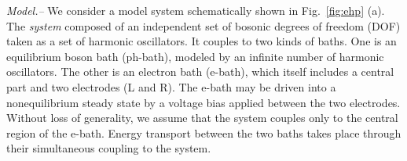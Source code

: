 \documentclass[aps
,twocolumn
,floatfix,footinbib,prl,longbibliography
]{revtex4-1}
\begin{document}








\emph{Model.--} 
We consider a model system schematically shown in Fig.~\ref{fig:ehp} (a). The \emph{system} composed of an independent set of bosonic degrees of freedom (DOF) taken as a set of harmonic oscillators. It couples to two kinds of baths. One is an equilibrium boson bath (ph-bath), modeled by an infinite number of harmonic oscillators. The other is an electron bath (e-bath), which itself includes a central part and two electrodes (L and R).  The e-bath may be driven into a nonequilibrium steady state by a voltage bias applied between the two electrodes. Without loss of generality, we assume that the system couples only to the central region of the e-bath. Energy transport between the two baths takes place through their simultaneous coupling to the system. 
\end{document}
